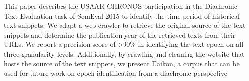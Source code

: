 This paper describes the USAAR-CHRONOS participation in the Diachronic Text Evaluation task of SemEval-2015 to identify the time period of historical text snippets. We adapt a web crawler to retrieve the original source of the text snippets and determine the publication year of the retrieved texts from their URLs. We report a precision score of >90\% in identifying the text epoch on all three granularity levels. Additionally, by crawling and cleaning the website that hosts the source of the text snippets, we present Daikon, a corpus that can be used for future work on epoch identification from a diachronic perspective
